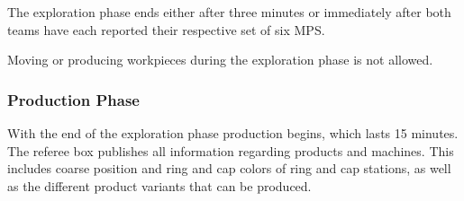 \documentclass[12pt,twoside]{article}
\begin{document}
The exploration phase ends either after three minutes or immediately after 
both teams have each reported their respective set of six MPS.

Moving or producing workpieces during the exploration phase is not allowed.

\subsubsection{Production Phase}
\label{sec:production-phase}
With the end of the exploration phase production begins, which lasts
\num{15} minutes. The referee box publishes all information regarding
products and machines. This includes coarse position and ring and cap
colors of ring and cap stations, as well as the different product
variants that can be produced.
\end{document}

